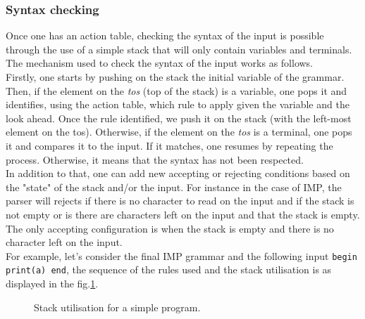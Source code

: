 \documentclass[a4paper,11pt]{article}
\begin{document}
    \subsubsection{Syntax checking}
      \label{sec:syntaxchecking}
      Once one has an action table, checking the syntax of the input is possible through the use of a simple stack that will only contain variables and terminals. The mechanism used to check the syntax of the input works as follows.\\
      Firstly, one starts by pushing on the stack the initial variable of the grammar. Then, if the element on the \textit{tos} (top of the stack) is a variable, one pops it and identifies, using the action table, which rule to apply given the variable and the look ahead. Once the rule identified, we push it on the stack (with the left-most element on the tos). Otherwise, if the element on the \textit{tos} is a terminal, one pops it and compares it to the input. If it matches, one resumes by repeating the process. Otherwise, it means that the syntax has not been respected.\\
      In addition to that, one can add new accepting or rejecting conditions based on the "state" of the stack and/or the input. For instance in the case of IMP, the parser will rejects if there is no character to read on the input and if the stack is not empty or is there are characters left on the input and that the stack is empty. The only accepting configuration is when the stack is empty and there is no character left on the input.\\
      For example, let's consider the final IMP grammar and the following input \verb|begin print(a) end|, the sequence of the rules used and the stack utilisation is as displayed in the fig.\ref{fig:simpleprogram}.
      \begin{figure}[h!]
        
        \caption{Stack utilisation for a simple program.}
        \label{fig:simpleprogram}
      \end{figure}
      
\end{document}
